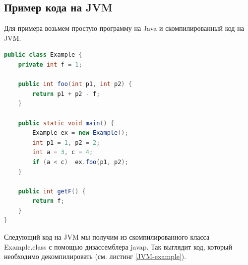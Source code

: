 \documentclass[14pt]{extarticle}
\begin{document}
\subsection{Пример кода на JVM}
Для примера возьмем простую программу на Java и скомпилированный код на JVM.

\begin{lstlisting}[label=Java-example,caption=Простой Java-класс, frame = single, language = Java]
public class Example {
    private int f = 1; 

    public int foo(int p1, int p2) {
        return p1 + p2 - f;
    }

    public static void main() {
        Example ex = new Example();
        int p1 = 1, p2 = 2;
        int a = 3, c = 4;
        if (a < c)  ex.foo(p1, p2);
    }

    public int getF() {
        return f;
    }
}
\end{lstlisting}

Следующий код на JVM мы получим из скомпилированного класса Example.class с помощью дизассемблера javap. Так выглядит код, который необходимо декомпилировать (см. листинг \ref{JVM-example}).
\end{document}
